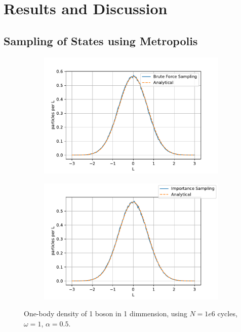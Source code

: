 \section{Results and Discussion}\label{sec:Discussion}
\subsection{Sampling of States using Metropolis}

\begin{figure}
	\begin{subfigure}{\textwidth}
		\centering
		\includegraphics[width=.8\linewidth]{figures/density1.pdf}
		\label{fig:sfig1}
	\end{subfigure}%
	\begin{subfigure}{\textwidth}
		\centering
		\includegraphics[width=.8\linewidth]{figures/density2.pdf}
		\label{fig:sfig2}
	\end{subfigure}
	\caption{One-body density of 1 boson in 1 dimmension, using $N = 1e6$ cycles, $\omega = 1$, $\alpha = 0.5$.}
	\label{fig:1 part 1 dim density}
\end{figure}

